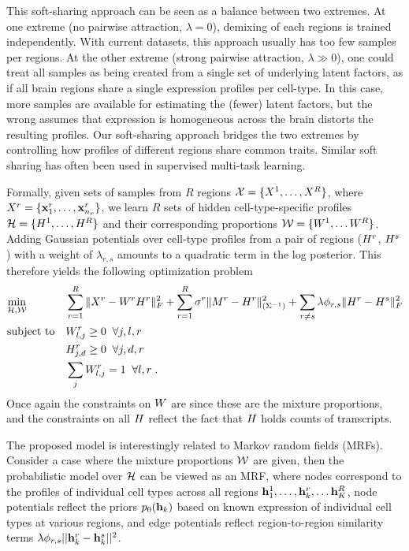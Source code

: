This soft-sharing approach can be seen as a balance between two extremes. At one extreme (no pairwise attraction, $\lambda=0$), demixing of each regions is trained independently. With current datasets, this approach usually has too few samples per regions.  At the other extreme (strong pairwise attraction, $\lambda \gg 0$), one could treat all samples as being created from a single set of underlying latent factors, as if all brain regions share a single expression profiles per cell-type. In this case, more samples are available for estimating the (fewer) latent factors, but the wrong assumes that expression is homogeneous across the brain   distorts the resulting profiles. Our soft-sharing approach bridges the two extremes by controlling how profiles of different regions share common traits. Similar soft sharing has often been used in supervised multi-task learning. 

Formally, given sets of samples from $R$ regions ${\cal{X}} = \{X^1,\ldots, X^R\}$, where $X^r = \{\mathbf{x}^r_1, \ldots, \mathbf{x}^r_{n_r} \}$, we learn $R$ sets of hidden cell-type-specific profiles ${\cal{{H}}} = \{{H}^1,\ldots, {H}^R\}$ and their corresponding proportions ${\cal{W}} = \{ W^1,\ldots W^R\}$. Adding Gaussian potentials over cell-type profiles from a pair of regions (${H}^r$, ${H}^s$) with a weight of $\lambda_{r,s}$ amounts to a quadratic term in the log posterior. This therefore yields the following optimization problem
\begin{equation}
    \label{eq-multi}
    \begin{aligned}
        & \underset{\cal{{H}},\cal{W}}{\text{min}}  
        & & \sum_{r=1}^R  \| X^r - W^r {H}^r \|_F^2
        + \sum_{r=1}^R  \sigma^r \| M^r - {H}^r \|^2_{(\Sigma^{-1})}  
        + \sum_{r \neq s} \lambda \phi_{r , s} \| {H}^r - {H}^s \|_F^2  \\
        & \text{subject to} &
            & W^r_{l,j} \geq 0 \;\; \forall j, l, r\\
        & & & H^r_{j,d} \geq 0 \;\;\forall j, d, r \\
        & & & \sum_j W^r_{l,j} = 1 \;\; \forall l,r \;. 
    \end{aligned}
\end{equation}
Once again the constraints on $W$ are since these are the mixture proportions, and the constraints on all ${H}$ reflect the fact that ${H}$ holds counts of transcripts.

The proposed model is interestingly related to Markov random fields (MRFs). Consider a case where the mixture proportions $\cal{W}$ are given, then the probabilistic model over $\cal{{H}}$ can be viewed as an MRF, where nodes correspond to the profiles of individual cell types across all regions $\mathbf{h}^1_1,\ldots, \mathbf{h}^r_k, \ldots \mathbf{h}^R_K$, node potentials reflect the priors $p_0(\mathbf{h}_k)$ based on known expression of individual cell types at various regions, and edge potentials reflect region-to-region similarity terms $\lambda \phi_{r,s}|| \mathbf{h}^r_k - \mathbf{h}^s_k||^2$. 

